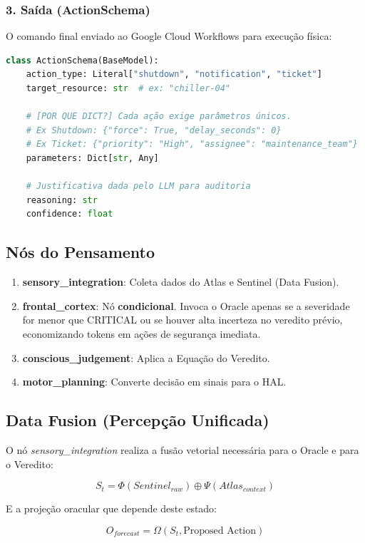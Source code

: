 \documentclass[12pt, a4paper]{article}
\begin{document}
\subsubsection{3. Saída (ActionSchema)}
O comando final enviado ao Google Cloud Workflows para execução física:
\begin{lstlisting}[language=Python]
class ActionSchema(BaseModel):
    action_type: Literal["shutdown", "notification", "ticket"]
    target_resource: str  # ex: "chiller-04"
    
    # [POR QUE DICT?] Cada ação exige parâmetros únicos.
    # Ex Shutdown: {"force": True, "delay_seconds": 0}
    # Ex Ticket: {"priority": "High", "assignee": "maintenance_team"}
    parameters: Dict[str, Any] 
    
    # Justificativa dada pelo LLM para auditoria
    reasoning: str
    confidence: float
\end{lstlisting}

\subsection{Nós do Pensamento}
\begin{enumerate}
    \item \textbf{sensory\_integration}: Coleta dados do Atlas e Sentinel (Data Fusion).
    \item \textbf{frontal\_cortex}: Nó \textbf{condicional}. Invoca o Oracle apenas se a severidade for menor que CRITICAL ou se houver alta incerteza no veredito prévio, economizando tokens em ações de segurança imediata.
    \item \textbf{conscious\_judgement}: Aplica a Equação do Veredito.
    \item \textbf{motor\_planning}: Converte decisão em sinais para o HAL.
\end{enumerate}

\subsection{Data Fusion (Percepção Unificada)}
O nó \textit{sensory\_integration} realiza a fusão vetorial necessária para o Oracle e para o Veredito:

\begin{equation}
S_{t} = \Phi(Sentinel_{raw}) \oplus \Psi(Atlas_{context})
\end{equation}

E a projeção oracular que depende deste estado:

\begin{equation}
O_{forecast} = \Omega(S_t, \text{Proposed Action})
\end{equation}
\end{document}
